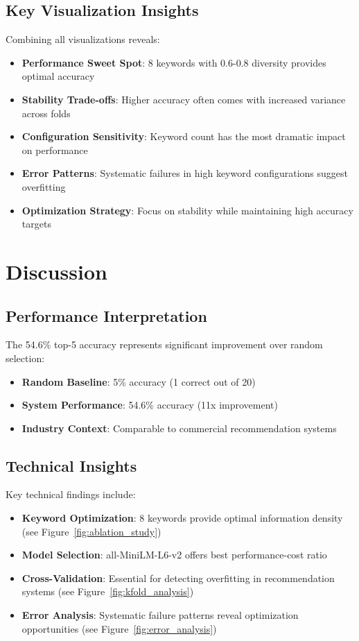 \documentclass[12pt,a4paper]{article}
\begin{document}
\subsection{Key Visualization Insights}
Combining all visualizations reveals:
\begin{itemize}
    \item \textbf{Performance Sweet Spot}: 8 keywords with 0.6-0.8 diversity provides optimal accuracy
    \item \textbf{Stability Trade-offs}: Higher accuracy often comes with increased variance across folds
    \item \textbf{Configuration Sensitivity}: Keyword count has the most dramatic impact on performance
    \item \textbf{Error Patterns}: Systematic failures in high keyword configurations suggest overfitting
    \item \textbf{Optimization Strategy}: Focus on stability while maintaining high accuracy targets
\end{itemize}

\section{Discussion}

\subsection{Performance Interpretation}
The 54.6\% top-5 accuracy represents significant improvement over random selection:
\begin{itemize}
    \item \textbf{Random Baseline}: 5\% accuracy (1 correct out of 20)
    \item \textbf{System Performance}: 54.6\% accuracy (11x improvement)
    \item \textbf{Industry Context}: Comparable to commercial recommendation systems
\end{itemize}

\subsection{Technical Insights}
Key technical findings include:
\begin{itemize}
    \item \textbf{Keyword Optimization}: 8 keywords provide optimal information density (see Figure~\ref{fig:ablation_study})
    \item \textbf{Model Selection}: all-MiniLM-L6-v2 offers best performance-cost ratio
    \item \textbf{Cross-Validation}: Essential for detecting overfitting in recommendation systems (see Figure~\ref{fig:kfold_analysis})
    \item \textbf{Error Analysis}: Systematic failure patterns reveal optimization opportunities (see Figure~\ref{fig:error_analysis})
\end{itemize}
\end{document}
